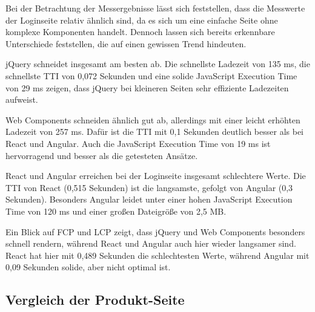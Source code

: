 \documentclass[oneside]{ausarbeitung}
\begin{document}
Bei der Betrachtung der Messergebnisse lässt sich feststellen, dass die Messwerte der Loginseite relativ ähnlich sind, da es sich um eine einfache Seite ohne komplexe Komponenten handelt. Dennoch lassen sich bereits erkennbare Unterschiede feststellen, die auf einen gewissen Trend hindeuten.

jQuery schneidet insgesamt am besten ab. Die schnellste Ladezeit von 135 ms, die schnellste TTI von 0,072 Sekunden und eine solide JavaScript Execution Time von 29 ms zeigen, dass jQuery bei kleineren Seiten sehr effiziente Ladezeiten aufweist.

Web Components schneiden ähnlich gut ab, allerdings mit einer leicht erhöhten Ladezeit von 257 ms. Dafür ist die TTI mit 0,1 Sekunden deutlich besser als bei React und Angular. Auch die JavaScript Execution Time von 19 ms ist hervorragend und besser als die getesteten Ansätze.

React und Angular erreichen bei der Loginseite insgesamt schlechtere Werte. Die TTI von React (0,515 Sekunden) ist die langsamste, gefolgt von Angular (0,3 Sekunden). Besonders Angular leidet unter einer hohen JavaScript Execution Time von 120 ms und einer großen Dateigröße von 2,5 MB.

Ein Blick auf FCP und LCP zeigt, dass jQuery und Web Components besonders schnell rendern, während React und Angular auch hier wieder langsamer sind. React hat hier mit 0,489 Sekunden die schlechtesten Werte, während Angular mit 0,09 Sekunden solide, aber nicht optimal ist.
\subsection{Vergleich der Produkt-Seite}
\end{document}
